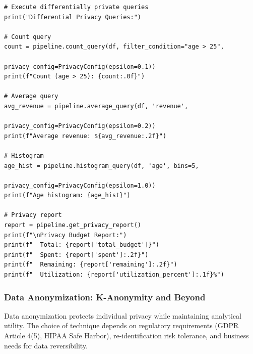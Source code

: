 \begin{lstlisting}[style=python, caption=PrivacyPreservingPipeline with Differential Privacy]
# Execute differentially private queries
print("Differential Privacy Queries:")

# Count query
count = pipeline.count_query(df, filter_condition="age > 25",
                             privacy_config=PrivacyConfig(epsilon=0.1))
print(f"Count (age > 25): {count:.0f}")

# Average query
avg_revenue = pipeline.average_query(df, 'revenue',
                                    privacy_config=PrivacyConfig(epsilon=0.2))
print(f"Average revenue: ${avg_revenue:.2f}")

# Histogram
age_hist = pipeline.histogram_query(df, 'age', bins=5,
                                    privacy_config=PrivacyConfig(epsilon=1.0))
print(f"Age histogram: {age_hist}")

# Privacy report
report = pipeline.get_privacy_report()
print(f"\nPrivacy Budget Report:")
print(f"  Total: {report['total_budget']}")
print(f"  Spent: {report['spent']:.2f}")
print(f"  Remaining: {report['remaining']:.2f}")
print(f"  Utilization: {report['utilization_percent']:.1f}%")
\end{lstlisting}

\subsubsection{Data Anonymization: K-Anonymity and Beyond}

Data anonymization protects individual privacy while maintaining analytical utility. The choice of technique depends on regulatory requirements (GDPR Article 4(5), HIPAA Safe Harbor), re-identification risk tolerance, and business needs for data reversibility.


